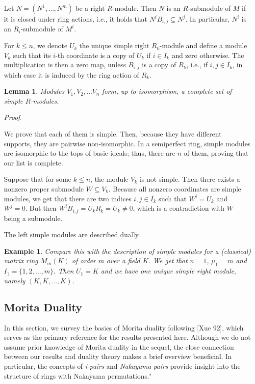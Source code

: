 \documentclass[11pt]{article}
\theoremstyle{plain}
\newtheorem{Lemma}[veta]{Lemma}
\newtheorem{Ex}[veta]{Example}
\theoremstyle{remark}
\theoremstyle{plain}
\newenvironment{Proof}{
  \par\medskip\noindent
  \textit{Proof}.
}{
\newline
\rightline{$\qedsymbol$}
}
\begin{document}
Let $N=(N^1,\dots, N^m)$ be a right $R$-module. Then $N$ is an $R$-submodule of $M$ if it is closed under ring actions, i.e., it holds that $N^iB_{i,j}\subseteq N^j$. In particular, $N^i$ is an $R_i$-submodule of $M^i$.



For $k\leq n$, we denote $U_k$ the unique simple right $R_k$-module and define a module $V_k$ such that its $i$-th coordinate is a copy of $U_k$ if $i\in I_k$ and zero otherwise. The multiplication is then a zero map, unless $B_{i,j}$ is a copy of $R_k$, i.e., if $i,j\in I_k$, in which case it is induced by the ring action of $R_k$.

\begin{Lemma}\label{LemmaSimplemodules}
    Modules $V_1, V_2, \dots V_n$ form, up to isomorphism, a complete set of simple $R$-modules.
\end{Lemma}
\begin{Proof}
    We prove that each of them is simple. Then, because they have different supports, they are pairwise non-isomorphic. In a semiperfect ring, simple modules are isomorphic to the tops of basic ideals; thus, there are $n$ of them, proving that our list is complete.

    Suppose that for some $k\leq n$, the module $V_k$ is not simple. Then there exists a nonzero proper submodule $W\subseteq V_k$. Because all nonzero coordinates are simple modules, we get that there are two indices $i,j\in I_k$ such that $W^i=U_k$ and $W^j=0$. But then $W^iB_{i,j}=U_kR_k=U_k\neq 0$, which is a contradiction with $W$ being a submodule.
    \end{Proof}
The left simple modules are described dually. 


\begin{Ex}
    Compare this with the description of simple modules for a (classical) matrix ring $M_m(K)$ of order $m$ over a field $K$. We get that $n=1$, $\mu_1=m$ and $I_1=\{1, 2, \dots, m\}$. Then $U_1=K$ and we have one unique simple right module, namely $(K, K, \dots, K)$.
\end{Ex}



\subsection{Morita Duality}\label{SecDual}

In this section, we survey the basics of Morita duality following [Xue 92], which serves as the primary reference for the results presented here. Although we do not assume prior knowledge of Morita duality in the sequel, the close connection between our results and duality theory makes a brief overview beneficial. In particular, the concepts of \textit{i-pairs} and \textit{Nakayama pairs} provide insight into the structure of rings with Nakayama permutations."
\end{document}
